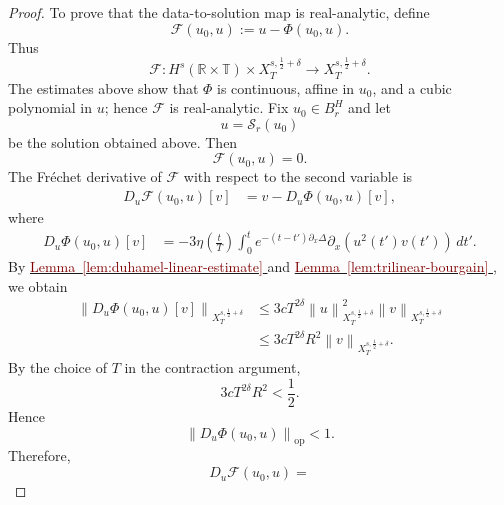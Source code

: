 \documentclass[12pt,oneside,reqno]{amsart}
\newcommand{\lemref}[1]{%
    \hyperref[#1]{%
        \textcolor{Maroon}{Lemma~\ref*{#1}}%
    }%
}
\numberwithin{equation}{section}
\theoremstyle{plain}
\def\R{{\mathbb R}}
\def\T{{\mathbb T}}
\newcommand{\norm}[1]{%
    \left\lVert #1\right\rVert%
}
\newcommand{\prc}[1]{%
    \left(#1\right)
}
\def\pt{\partial}
\newcommand{\rt}{\R\times\T}
\begin{document}
\begin{proof}
\smallskip
To prove that the data-to-solution map is real-analytic, define
\begin{equation}
    \mathcal F(u_0,u)
    :=
    u-\Phi(u_0,u).
\end{equation}
Thus
\begin{equation}
    \mathcal F:
    H^s(\rt)
    \times
    X_T^{s,\frac12+\delta}
    \longrightarrow
    X_T^{s,\frac12+\delta}.
\end{equation}
The estimates above show that $\Phi$ is continuous, affine in $u_0$, and a
cubic polynomial in $u$; hence $\mathcal F$ is real-analytic. Fix
$u_0\in B_r^H$ and let
\begin{equation}
    u=\mathcal S_r(u_0)
\end{equation}
be the solution obtained above. Then
\begin{equation}
    \mathcal F(u_0,u)=0.
\end{equation}
The Fr\'echet derivative of $\mathcal F$ with respect to the second
variable is
\begin{equation}
\begin{aligned}
D_u\mathcal F(u_0,u)[v]
&=
v-D_u\Phi(u_0,u)[v],
\end{aligned}
\end{equation}
where
\begin{equation}
\label{derivativeOfGamma}
\begin{aligned}
D_u\Phi(u_0,u)[v]
&=
-3
\eta\prc{\frac{t}{T}}
\int_0^t
e^{-(t-t')\pt_x\Delta}
\pt_x
\prc{
    u^2(t')v(t')
}
\,dt'.
\end{aligned}
\end{equation}
By \lemref{lem:duhamel-linear-estimate} and \lemref{lem:trilinear-bourgain},
we obtain
\begin{align}
\norm{
    D_u\Phi(u_0,u)[v]
}_{X_T^{s,\frac12+\delta}}
&\leq
3cT^{2\delta}
\norm{u}_{X_T^{s,\frac12+\delta}}^2
\norm{v}_{X_T^{s,\frac12+\delta}}
\nonumber\\
&\leq
3cT^{2\delta}R^2
\norm{v}_{X_T^{s,\frac12+\delta}}.
\end{align}
By the choice of $T$ in the contraction argument,
\begin{equation}
    3cT^{2\delta}R^2
    <
    \frac12.
\end{equation}
Hence
\begin{equation}
    \norm{
        D_u\Phi(u_0,u)
    }_{\operatorname{op}}
    <
    1.
\end{equation}
Therefore,
\begin{equation}
    D_u\mathcal F(u_0,u)
    =

\end{equation}
\end{proof}
\end{document}
